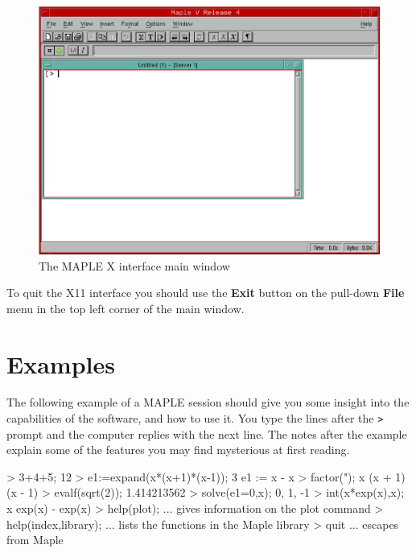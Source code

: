 \documentclass[twoside,11pt]{starlink}
\begin{document}
\begin{figure}[h]
\begin{center}
\includegraphics[scale=0.55]{sun107_f1}
\caption{The MAPLE X interface main window}
\label{fig_main_window}
\end{center}
\end{figure}

To quit the X11 interface you should use the \textbf{Exit} button on the
pull-down \textbf{File} menu in the top left corner of the main window.

\section{Examples}

The following example of a MAPLE session should give you some insight
into the capabilities of the software, and how to use it.  You type the
lines after the \verb+>+ prompt and the computer replies with the next line.
The notes after the example explain some of the features you may find
mysterious at first reading.

\begin{terminalv}
> 3+4+5;
                               12
> e1:=expand(x*(x+1)*(x-1));
                               3
                        e1 := x  - x
> factor(");
                        x (x + 1) (x - 1)
> evalf(sqrt(2));
                        1.414213562
> solve(e1=0,x);
                        0, 1, -1
> int(x*exp(x),x);
                        x exp(x) - exp(x)
> help(plot);
     ... gives information on the plot command
> help(index,library);
     ... lists the functions in the Maple library
> quit
     ... escapes from Maple
\end{terminalv}
\end{document}
